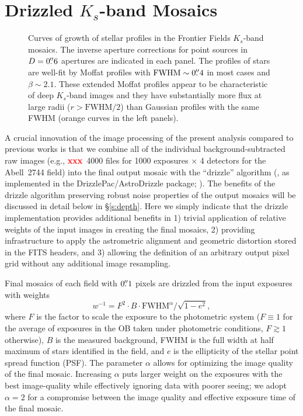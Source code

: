 \documentclass[preprint2]{aastex6}
\newcommand\xxx{{\textcolor{red}{\bf xxx}}}
\begin{document}
\section{Drizzled $K_s$-band Mosaics}
\label{s:mosaic}


\begin{figure*}[!t]
\caption{Curves of growth of stellar profiles in the Frontier Fields $K_s$-band mosaics.  The inverse aperture corrections for point sources in $D=0\mbox{$.\!\!^{\prime\prime}$}6$ apertures are indicated in each panel.  The profiles of stars are well-fit by Moffat profiles with $\mathrm{FWHM}\sim0\mbox{$.\!\!^{\prime\prime}$}4$ in most cases and $\beta\sim2.1$.  These extended Moffat profiles appear to be characteristic of deep $K_s$-band images and they have substantially more flux at large radii ($r>\mathrm{FWHM}/2$) than Gaussian profiles with the same FWHM (orange curves in the left panels).  \label{fig:cog}}  
\end{figure*}

A crucial innovation of the image processing of the present analysis compared to previous works is that we combine all of the individual background-subtracted raw images (e.g., \xxx\ 4000 files for 1000 exposures $\times$ 4 detectors for the \mbox{Abell 2744} field) into the final output mosaic with the ``drizzle'' algorithm (\citealp{fruchter:02}, as implemented in the DrizzlePac/AstroDrizzle package; \citealp{drizzlepac}).  The benefits of the drizzle algorithm  preserving robust noise properties of the output mosaics will be discussed in detail below in \S\ref{s:depth}.  Here we simply indicate that the drizzle implementation provides additional benefits in 1) trivial application of relative weights of the input images in creating the final mosaics, 2) providing infrastructure to apply the astrometric alignment and geometric distortion stored in the FITS headers, and 3) allowing the definition of an arbitrary output pixel grid without any additional image resampling.

Final mosaics of each field with $0\mbox{$.\!\!^{\prime\prime}$}1$ pixels are drizzled from the input exposures with weights
\begin{equation}
w^{-1} = F^2\cdot B \cdot \mathrm{FWHM}^\alpha / \sqrt{1-e^2}, 
\label{eq:weight}
\end{equation}
where $F$ is the factor to scale the exposure to the photometric system ($F\equiv1$ for the average of exposures in the OB taken under photometric conditions, $F\gtrsim1$ otherwise), $B$ is the measured background, FWHM is the full width at half maximum of stars identified in the field, and $e$ is the ellipticity of the stellar point spread function (PSF).  The parameter $\alpha$ allows for optimizing the image quality of the final mosaic.  Increasing $\alpha$ puts larger weight on the exposures with the best image-quality while effectively ignoring data with poorer seeing; we adopt $\alpha=2$ for a compromise between the image quality and effective exposure time of the final mosaic.  
\end{document}
